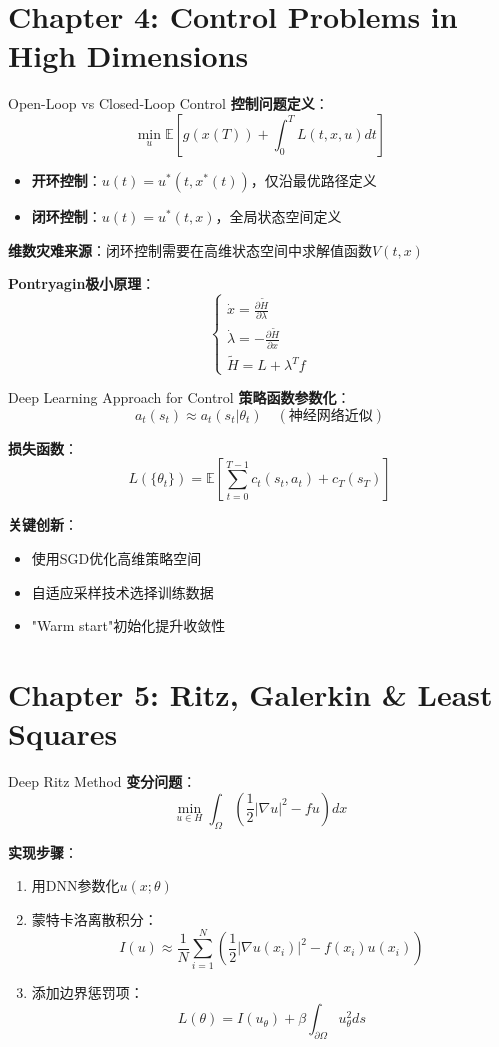 \documentclass[aspectratio=169]{beamer}
\begin{document}
	\section{Chapter 4: Control Problems in High Dimensions}
	\begin{frame}{Open-Loop vs Closed-Loop Control}
		\textbf{控制问题定义}：
		\[
		\min_{u} \mathbb{E}\left[ g(x(T)) + \int_0^T L(t,x,u) dt \right]
		\]
		\begin{itemize}
			\item \textbf{开环控制}：$u(t) = u^*(t,x^*(t))$，仅沿最优路径定义
			\item \textbf{闭环控制}：$u(t) = u^*(t,x)$，全局状态空间定义
		\end{itemize}

		\textbf{维数灾难来源}：闭环控制需要在高维状态空间中求解值函数$V(t,x)$

		\textbf{Pontryagin极小原理}：
		\[
		\begin{cases}
		\dot{x} = \frac{\partial \tilde{H}}{\partial \lambda} \\
		\dot{\lambda} = -\frac{\partial \tilde{H}}{\partial x} \\
		\tilde{H} = L + \lambda^T f
		\end{cases}
		\]
	\end{frame}

	\begin{frame}{Deep Learning Approach for Control}
		\textbf{策略函数参数化}：
		\[
		a_t(s_t) \approx a_t(s_t|\theta_t) \quad (\text{神经网络近似})
		\]

		\textbf{损失函数}：
		\[
		L(\{\theta_t\}) = \mathbb{E}\left[ \sum_{t=0}^{T-1} c_t(s_t,a_t) + c_T(s_T) \right]
		\]

		\textbf{关键创新}：
		\begin{itemize}
			\item 使用SGD优化高维策略空间
			\item 自适应采样技术选择训练数据
			\item "Warm start"初始化提升收敛性
		\end{itemize}
	\end{frame}

	\section{Chapter 5: Ritz, Galerkin \& Least Squares}
	\begin{frame}{Deep Ritz Method}
		\textbf{变分问题}：
		\[
		\min_{u \in H} \int_\Omega \left( \frac{1}{2}|\nabla u|^2 - fu \right) dx
		\]

		\textbf{实现步骤}：
		\begin{enumerate}
			\item 用DNN参数化$u(x;\theta)$
			\item 蒙特卡洛离散积分：
			\[
			I(u) \approx \frac{1}{N}\sum_{i=1}^N \left( \frac{1}{2}|\nabla u(x_i)|^2 - f(x_i)u(x_i) \right)
			\]
			\item 添加边界惩罚项：
			\[
			L(\theta) = I(u_\theta) + \beta \int_{\partial\Omega} u_\theta^2 ds
			\]
		\end{enumerate}
	\end{frame}
\end{document}

